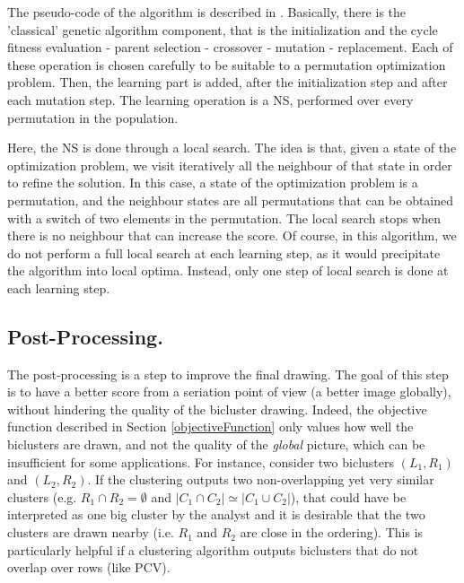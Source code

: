 \documentclass[twoside,leqno,twocolumn]{article}
\theoremstyle{definition}
\begin{document}
 \medskip

\noindent The pseudo-code of the algorithm is described in \cite{Wang2004HybridGA}. Basically, there is the 'classical' genetic algorithm component, that is the initialization and the cycle fitness evaluation - parent selection - crossover - mutation - replacement. Each of these operation is chosen carefully to be suitable to a permutation optimization problem. Then, the learning part is added, after the initialization step and after each mutation step. The learning operation is a NS, performed over every permutation in the population.

\medskip

\noindent Here, the NS is done through a local search. The idea is that, given a state of the optimization problem, we visit iteratively all the neighbour of that state in order to refine the solution. In this case, a state of the optimization problem is a permutation, and the neighbour states are all permutations that can be obtained with a switch of two elements in the permutation. The local search stops when there is no neighbour that can increase the score. Of course, in this algorithm, we do not perform a full local search at each learning step, as it would precipitate the algorithm into local optima. Instead, only one step of local search is done at each learning step.


\subsection{Post-Processing.}

The post-processing is a step to improve the final drawing. The goal of this step is to have a better score from a seriation point of view (a better image globally), without hindering the quality of the bicluster drawing. Indeed, the objective function described in Section \ref{objectiveFunction} only values how well the biclusters are drawn, and not the quality of the \emph{global} picture, which can be insufficient for some applications. For instance, consider two biclusters $(L_1,R_1)$ and $(L_2,R_2)$. If the clustering outputs two non-overlapping yet very similar clusters (e.g. $R_1 \cap R_2 = \emptyset$ and $|C_1 \cap C_2| \simeq |C_1 \cup C_2|$), that could have be interpreted as one big cluster by the analyst and it is desirable that the two clusters are drawn nearby (i.e. $R_1$ and $R_2$ are close in the ordering). This is particularly helpful if a clustering algorithm outputs biclusters that do not overlap over rows (like PCV).
\end{document}
